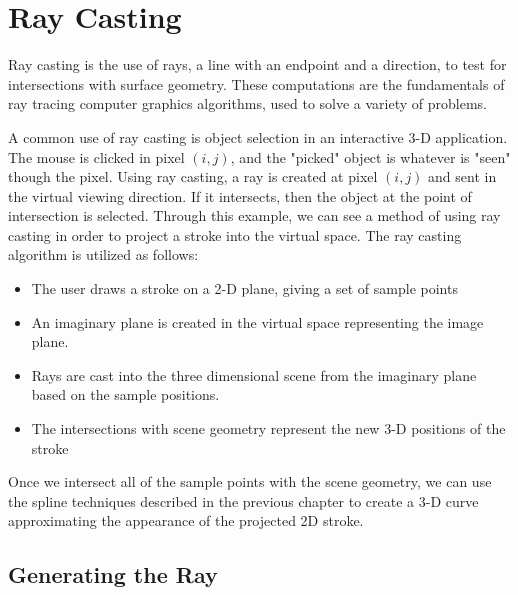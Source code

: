 \documentclass[12pt]{report}
\begin{document}
\section{Ray Casting}

Ray casting is the use of rays, a line with an endpoint and a direction, to test for intersections with surface geometry.
These computations are the fundamentals of ray tracing computer graphics algorithms, used to solve a variety of problems.

A common use of ray casting is object selection in an interactive 3-D application.
The mouse is clicked in pixel $(i,j)$, and the "picked" object is whatever is "seen" though the pixel.
Using ray casting, a ray is created at pixel $(i,j)$ and sent in the virtual viewing direction.
If it intersects, then the object at the point of intersection is selected.
Through this example, we can see a method of using ray casting in order to project a stroke into the virtual space.
The ray casting algorithm is utilized as follows:
\begin{itemize}
\item The user draws a stroke on a 2-D plane, giving a set of sample points
\item An imaginary plane is created in the virtual space representing the image plane.
\item Rays are cast into the three dimensional scene from the imaginary plane based on the sample positions.
\item The intersections with scene geometry represent the new 3-D positions of the stroke
\end{itemize}
Once we intersect all of the sample points with the scene geometry, we can use the spline techniques described in the previous chapter to create a 3-D curve approximating the appearance of the projected 2D stroke.

\subsection{Generating the Ray}
\end{document}
